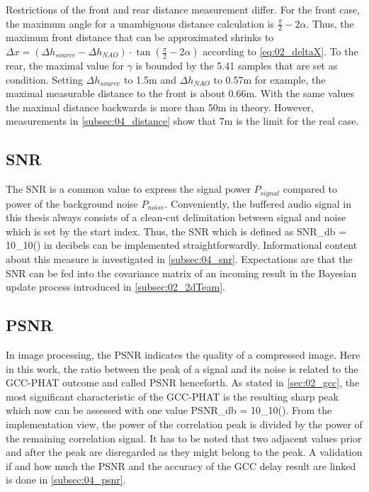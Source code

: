 Restrictions of the front and rear distance measurement differ.
For the front case, the maximum angle for a unambiguous distance calculation
is $\frac{\pi}{2}- 2\alpha$.
Thus, the maximum front distance that can be approximated shrinks to
$\Delta x = (\Delta h_{source} - \Delta h_{NAO}) \cdot \tan(\frac{\pi}{2} - 2\alpha)$
according to \cref{eq:02_deltaX}.
To the rear, the maximal value for $\gamma$ is bounded by the 5.41 samples that
are set as condition.
Setting $\Delta h_{source}$ to 1.5\si{m} and $\Delta h_{NAO}$ to 0.57\si{\meter} for example,
the maximal measurable distance to the front is about 0.66\si{\meter}.
With the same values the maximal distance backwards is more than 50\si{\meter} in theory.
However, measurements in \cref{subsec:04_distance} show that 7\si{\meter} is the
limit for the real case. 


\subsection{SNR}
\label{subsec:03_snr}

The \acf{SNR} is a common value to express the signal power $P_{signal}$ compared
to power of the background noise $P_{noise}$.
Conveniently, the buffered audio signal in this thesis always consists of
a clean-cut delimitation between signal and noise which is set by the
start index.
Thus, the \ac{SNR} which is defined as
\bal
    SNR_{db} = 10\log_{10}\left(\right)
    \label{eq:03_snr}
\eal
in decibels can be implemented straightforwardly.
Informational content about this measure is investigated in \cref{subsec:04_snr}.
Expectations are that the \ac{SNR} can be fed into the covariance matrix
of an incoming result in the Bayesian update process introduced in \cref{subsec:02_2dTeam}.

\subsection{PSNR}
\label{subsec:03_psnr}
In image processing, the \acf{PSNR} indicates the quality of a compressed
image. Here in this work, the ratio between the peak of a signal
and its noise is related to the \ac{GCC-PHAT} outcome and called \ac{PSNR}
henceforth.
As stated in \cref{sec:02_gcc}, the most significant characteristic
of the \ac{GCC-PHAT} is the resulting sharp peak which now can be
assessed with one value
\bal
    PSNR_{db} = 10\log_{10}\left(\right).
    \label{eq:03_psnr}
\eal
From the implementation view, the power of the correlation peak is divided by
the power of the remaining correlation signal.
It has to be noted that two adjacent values prior and after the peak
are disregarded as they might belong to the peak.
A validation if and how much the \ac{PSNR} and the accuracy of the \ac{GCC}
delay result are linked is done in \cref{subsec:04_psnr}.
